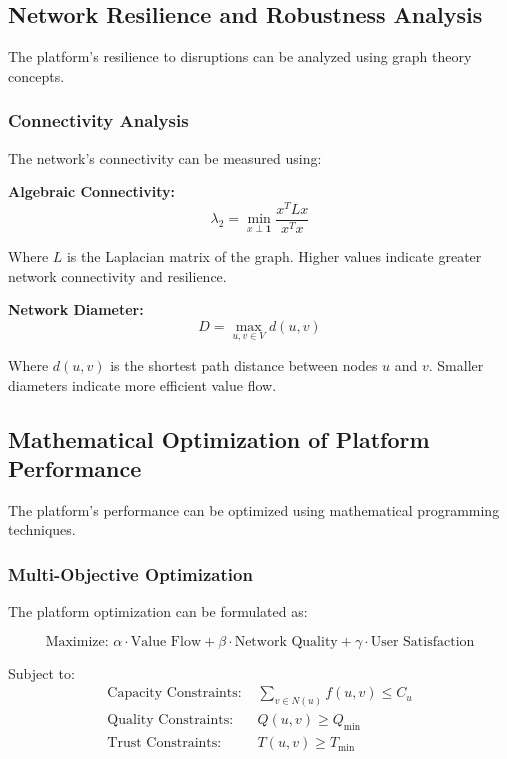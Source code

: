 \subsection{Network Resilience and Robustness Analysis}

The platform's resilience to disruptions can be analyzed using graph theory concepts.

\subsubsection{Connectivity Analysis}

The network's connectivity can be measured using:

\textbf{Algebraic Connectivity:}
\begin{equation}
\lambda_2 = \min_{x \perp \mathbf{1}} \frac{x^T L x}{x^T x}
\end{equation}

Where $L$ is the Laplacian matrix of the graph. Higher values indicate greater network connectivity and resilience.

\textbf{Network Diameter:}
\begin{equation}
D = \max_{u,v \in V} d(u,v)
\end{equation}

Where $d(u,v)$ is the shortest path distance between nodes $u$ and $v$. Smaller diameters indicate more efficient value flow.

\subsection{Mathematical Optimization of Platform Performance}

The platform's performance can be optimized using mathematical programming techniques.

\subsubsection{Multi-Objective Optimization}

The platform optimization can be formulated as:

\begin{equation}
\text{Maximize: } \alpha \cdot \text{Value Flow} + \beta \cdot \text{Network Quality} + \gamma \cdot \text{User Satisfaction}
\end{equation}

Subject to:
\begin{align}
\text{Capacity Constraints: } & \sum_{v \in N(u)} f(u,v) \leq C_u \\
\text{Quality Constraints: } & Q(u,v) \geq Q_{\min} \\
\text{Trust Constraints: } & T(u,v) \geq T_{\min}
\end{align}

